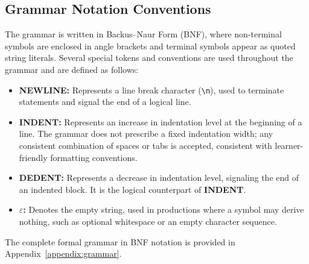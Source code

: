 \subsection{Grammar Notation Conventions}

The grammar is written in Backus--Naur Form (BNF), where non-terminal symbols are enclosed in angle brackets and terminal symbols appear as quoted string literals.
Several special tokens and conventions are used throughout the grammar and are defined as follows:

\begin{itemize}
    \item[\textbf{--}] \textbf{NEWLINE:} Represents a line break character (\texttt{\textbackslash n}), used to terminate statements and signal the end of a logical line.
    \item[\textbf{--}] \textbf{INDENT:} Represents an increase in indentation level at the beginning of a line. The grammar does not prescribe a fixed indentation width; any consistent combination of spaces or tabs is accepted, consistent with learner-friendly formatting conventions.
    \item[\textbf{--}] \textbf{DEDENT:} Represents a decrease in indentation level, signaling the end of an indented block. It is the logical counterpart of \textbf{INDENT}.
    \item[\textbf{--}] \textbf{$\varepsilon$:} Denotes the empty string, used in productions where a symbol may derive nothing, such as optional whitespace or an empty character sequence.
\end{itemize}

The complete formal grammar in BNF notation is provided in Appendix~\ref{appendix:grammar}.